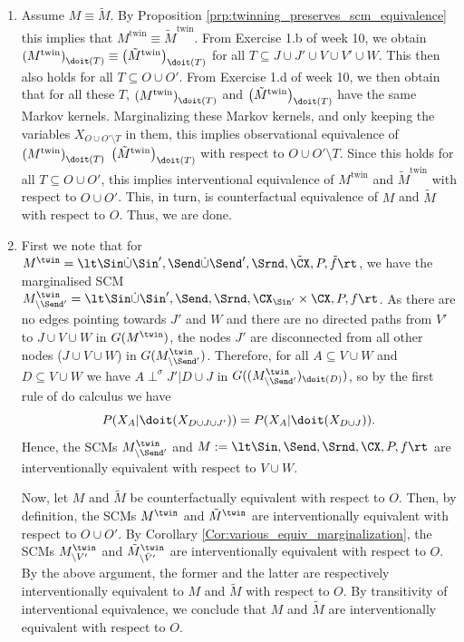 \begin{enumerate}
\begin{gradedsolution}
	\begin{enumerate}
		\item Assume $M \equiv \tilde{M}$.
		By Proposition \ref*{prp:twinning_preserves_scm_equivalence} this implies that $M^{\text{twin}} \equiv \tilde{M}^{\text{twin}}$.
		From Exercise 1.b of week 10, we obtain $\left( M^{\text{twin}}\right)_{\doit(T)} \equiv \left( \tilde{M}^{\text{twin}}\right)_{\doit(T)} $ for all $T \subseteq J \cup J' \cup V \cup V' \cup W$.
		This then also holds for all $T \subseteq O \cup O'$.
		From Exercise 1.d of week 10, we then obtain that for all these $T$, $\left( M^{\text{twin}}\right)_{\doit(T)} $ and $\left( \tilde{M}^{\text{twin}}\right)_{\doit(T)} $ have the same Markov kernels.
		Marginalizing these Markov kernels, and only keeping the variables $X_{O \cup O' \setminus T}$ in them, this implies observational equivalence of $\left( M^{\text{twin}}\right)_{\doit(T)} $ $\left( \tilde{M}^{\text{twin}}\right)_{\doit(T)} $ with respect to $O \cup O' \setminus T$.
		Since this holds for all $T \subseteq O \cup O'$, this implies interventional equivalence of $M^{\text{twin}}$ and $\tilde{M}^{\text{twin}}$ with respect to $O \cup O'$.
		This, in turn, is counterfactual equivalence of $M$ and $\tilde{M}$ with respect to $O$.
		Thus, we are done.
		\item First we note that for $M^\twin = \lt \Sin \dot\cup \Sin', \Send \dot\cup \Send', \Srnd, \tilde{\CX}, P, \tilde{f} \rt$, we have the marginalised SCM $M^\twin_{\setminus \Send'} = \lt \Sin \dot\cup \Sin', \Send, \Srnd, \CX_{\Sin'}\times \CX, P, f \rt$. As there are no edges pointing towards $J'$ and $W$ and there are no directed paths from $V'$ to $J\cup V\cup W$ in $G(M^\twin)$, the nodes $J'$ are disconnected from all other nodes ($J\cup V\cup W$) in $G(M^\twin_{\setminus \Send'})$. Therefore, for all $A\subseteq V\cup W$ and $D\subseteq V\cup W$ we have $A\perp^\sigma J' | D\cup J$ in $G((M^\twin_{\setminus \Send'})_{\doit(D)})$, so by the first rule of do calculus we have
		$$P(X_A | \doit(X_{D\cup J \cup J'})) = P(X_A | \doit(X_{D\cup J})).$$
		Hence, the SCMs $M^\twin_{\setminus \Send'}$ and $M := \lt \Sin, \Send, \Srnd, \CX, P, f \rt$ are interventionally equivalent with respect to $V\cup W$.
		
		
		Now, let $M$ and $\tilde{M}$ be counterfactually equivalent with respect to $O$. Then, by definition, the SCMs $M^\twin$ and $\tilde{M}^\twin$ are interventionally equivalent with respect to $O\cup O'$. By Corollary \ref*{Cor:various_equiv_marginalization}, the SCMs $M^\twin_{\setminus V'}$ and $\tilde{M}^\twin_{\setminus \tilde{V}'}$ are interventionally equivalent with respect to $O$. By the above argument, the former and the latter are respectively interventionally equivalent to $M$ and $\tilde{M}$ with respect to $O$. By transitivity of interventional equivalence, we conclude that $M$ and $\tilde{M}$ are interventionally equivalent with respect to $O$.
		

\end{enumerate}
\end{gradedsolution}
\end{enumerate}
